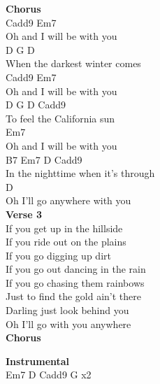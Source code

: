 \documentclass[a4paper]{article}
\begin{document}
{{        }
        \textbf{Chorus}
        ~\\
        {
            \cutive
            \obeyspaces
Cadd9      Em7
\\
 Oh and I will be with you
\\
D         G       D
\\
 When the darkest winter comes
\\
Cadd9     Em7
\\
 Oh and I will be with you
\\
D            G      D   Cadd9
\\
 To feel the California sun      
\\
         Em7
\\
 Oh and I will be with you
\\
B7      Em7       D          Cadd9
\\
 In the nighttime when it's through
\\
D
\\
 Oh I'll go anywhere with you
\\

        }
        \textbf{Verse 3}
        ~\\
        {
            \cutive
            \obeyspaces
If you get up in the hillside
\\
If you ride out on the plains
\\
If you go digging up dirt
\\
If you go out dancing in the rain
\\
If you go chasing them rainbows
\\
Just to find the gold ain't there
\\
Darling just look behind you
\\
Oh I'll go with you anywhere
\\

        }
        \textbf{Chorus}
        ~\\
        {
            \cutive
            \obeyspaces

        }
        \textbf{Instrumental}
        ~\\
        {
            \cutive
            \obeyspaces
Em7 D Cadd9 G x2
\\

}}
\end{document}
